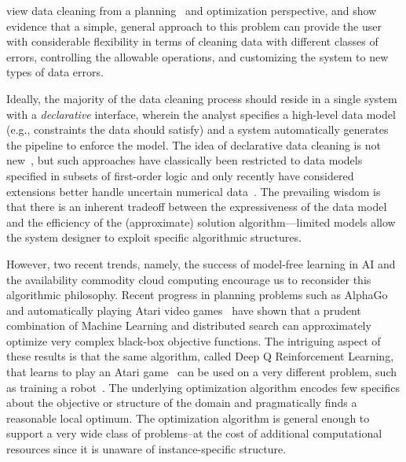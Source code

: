 

view data cleaning from a planning~\cite{} and optimization perspective, and show evidence that a simple, general approach to this problem can provide the user with considerable flexibility in terms of cleaning data with different classes of errors, controlling the allowable operations, and customizing the system to new types of data errors.



Ideally, the majority of the data cleaning process should reside in a single system with a  \emph{declarative} interface, wherein the analyst specifies a high-level data model (e.g., constraints the data should satisfy) and a system automatically generates the pipeline to enforce the model.
The idea of declarative data cleaning is not new~\cite{rahm2000data}, but such approaches have classically been restricted to data models specified in subsets of first-order logic and only recently have considered extensions better handle uncertain numerical data~\cite{prokoshyna2015combining}.
The prevailing wisdom is that there is an inherent tradeoff between the expressiveness of the data model and the efficiency of the (approximate) solution algorithm---limited models allow the system designer to exploit specific algorithmic structures.


However, two recent trends, namely, the success of model-free learning in AI and the availability commodity cloud computing encourage us to reconsider this algorithmic philosophy.
Recent progress in planning problems such as AlphaGo~\cite{silver2016mastering} and automatically playing Atari video games~\cite{mnih2015human} have shown that a prudent combination of Machine Learning and distributed search can approximately optimize very complex black-box objective functions.
The intriguing aspect of these results is that the same algorithm, called Deep Q Reinforcement Learning, that learns to play an Atari game~\cite{mnih2015human} can be used on a very different problem, such as training a robot~\cite{gu2017deep}.
The underlying optimization algorithm encodes few specifics about the objective or structure of the domain  and pragmatically finds a reasonable local optimum.
The optimization algorithm is general enough to support a very wide class of problems--at the cost of additional computational resources since it is unaware of instance-specific structure.

\fi
